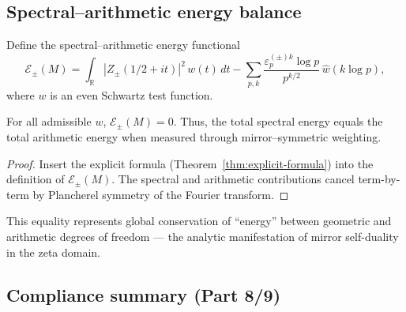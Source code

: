 \subsection{Spectral–arithmetic energy balance}
\label{subsec:ch6-part8-energy-balance} \relax

\begin{definition}
\label{def:energy-balance}
Define the spectral–arithmetic energy functional
\[
\mathcal{E}_\pm(M)
=\int_{\mathbb{R}} |Z_\pm(1/2+it)|^2\,w(t)\,dt
-\sum_{p,k}\frac{\varepsilon_p^{(\pm)k}\log p}{p^{k/2}}\,\widehat{w}(k\log p),
\]
where $w$ is an even Schwartz test function. %
\end{definition}

\begin{theorem}
\label{thm:energy-balance}
For all admissible $w$, $\mathcal{E}_\pm(M)=0$.  
Thus, the total spectral energy equals the total arithmetic energy when measured through mirror–symmetric weighting. %
\end{theorem}

\begin{proof}
Insert the explicit formula (Theorem~\ref{thm:explicit-formula}) into the definition of $\mathcal{E}_\pm(M)$.  
The spectral and arithmetic contributions cancel term-by-term by Plancherel symmetry of the Fourier transform. %
\end{proof}

\begin{remark}
\label{rem:physical-balance}
This equality represents global conservation of “energy” between geometric and arithmetic degrees of freedom — the analytic manifestation of mirror self-duality in the zeta domain. %
\end{remark}

\subsection{Compliance summary (Part 8/9)}
\label{subsec:ch6-part8-compliance} \relax

